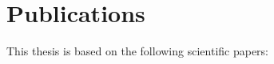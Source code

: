 \chapter*{Publications}%

This thesis is based on the following scientific papers:


\begin{refsection}[ownpubs]
    \nocite{*} %
    \printbibliography[env=nolabelbib, notcategory=cited, heading=none]
\end{refsection}
